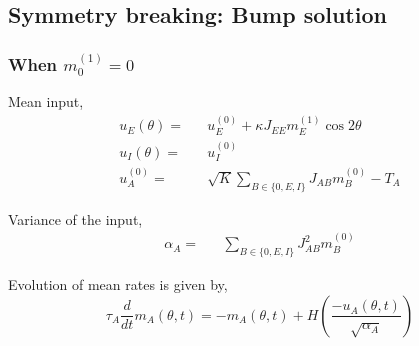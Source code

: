 


\subsection{Symmetry breaking: Bump solution} 

\subsubsection{When  $m_0^{(1)} = 0$}

Mean input, \\
\begin{eqnarray}
u_E(\theta) =&& u^{(0)}_E + \kappa J_{EE} m_E^{(1)} \cos 2 \theta \\
u_I(\theta) =&& u^{(0)}_I \\
u^{(0)}_A =&& \sqrt{K} \sum_{B \in \lbrace 0, E, I\rbrace} J_{AB} m_B^{(0)}  - T_A\label{uaTeq} 
\end{eqnarray}

Variance of the input,\\
\begin{eqnarray}
\alpha_A =&& \sum_{B \in \lbrace 0, E, I\rbrace} J_{AB}^2 m_B^{(0)} \label{alphaE}
\end{eqnarray}

Evolution of mean rates is given by,\\
\begin{equation}
\tau_A \frac{d}{dt} m_A(\theta, t) = -m_A(\theta, t) + H\left( \frac{-u_A(\theta, t)}{\sqrt{\alpha_A}} \right)
\end{equation}
\\

